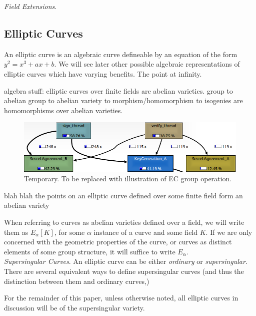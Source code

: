 \noindent
\emph{Field Extensions}.

\subsection{Elliptic Curves}

An elliptic curve is an algebraic curve defineable by an equation of the form $y^2 = x^3 + ax + b$. We will see later other possible algebraic representations of  elliptic curves which have varying benefits.
The point at infinity.

algebra stuff:
elliptic curves over finite fields are abelian varieties. 
group to abelian group to abelian variety to morphism/homomorphism to isogenies are homomorphisms over abelian varieties.

\begin{figure}[htb]
\centering
\includegraphics[scale=0.3]{signandverifycall.png} %
\caption{Temporary. To be replaced with illustration of EC group operation.}
\label{fig:label} %
\end{figure}

blah blah the points on an elliptic curve defined over some finite field form an abelian variety

When referring to curves as abelian varieties defined over a field, we will write them as $E_{\alpha}[K]$, for some $\alpha$ instance of a curve and some field $K$. If we are only concerned with the geometric properties of the curve, or curves as distinct elements of some group structure, it will suffice to write $E_{\alpha}$.\\

\noindent
\emph{Supersingular Curves}. An elliptic curve can be either \emph{ordinary} or \emph{supersingular}. There are several equivalent ways to define supersingular curves (and thus the distinction between them and ordinary curves,)

For the remainder of this paper, unless otherwise noted, all elliptic curves in discussion will be of the supersingular variety.

